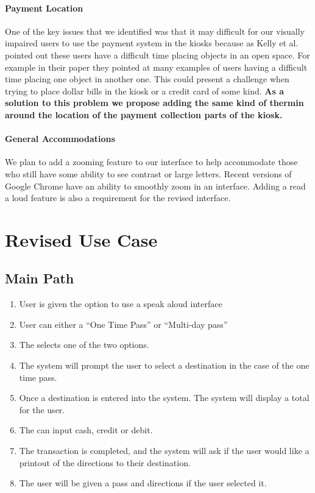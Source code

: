 \documentclass{article}
\begin{document}
            \paragraph{Payment Location}
                One of the key issues that we identified was that it may difficult for our visually impaired users
                to use the payment system in the kiosks because as Kelly et al. pointed out these users have a 
                difficult time placing objects in an open space\cite{doi:10.1001/archopht.120.6.774}. 
                For example in their paper they pointed at many examples of users having a difficult time placing
                one object in another one. This could present a challenge when trying to place dollar bills in the
                kiosk or a credit card of some kind. \textbf{As a solution to this problem we propose adding the
                same kind of thermin around the location of the payment collection parts of the kiosk.} 

            \paragraph{General Accommodations}
                We plan to add a zooming feature to our interface to help accommodate those who still have some ability
                to see contrast or large letters. Recent versions of Google Chrome have an ability to smoothly zoom
                in an interface. Adding a read a loud feature is also a requirement for the revised interface.

    
    \section{Revised Use Case}
        \subsection{Main Path}
        \begin{enumerate}
            \item User is given the option to use a speak aloud interface
            \item User can either a ``One Time Pass'' or ``Multi-day pass''
            \item The selects one of the two options.
            \item The system will prompt the user to select a destination in the
            case of the one time pass.
            \item Once a destination is entered into the system. The system will display
            a total for the user.
            \item The can input cash, credit or debit.
            \item The transaction is completed, and the system will ask if the user
            would like a printout of the directions to their destination.
            \item The user will be given a pass and directions if the user selected it. 
        \end{enumerate}
\end{document}

